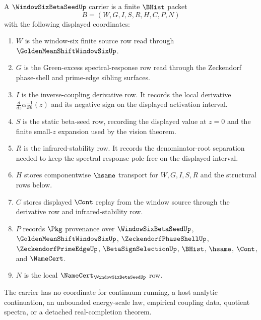 \begin{definition}
\label{def:window-six-beta-seed-carrier}
A $\WindowSixBetaSeedUp$ carrier is a finite $\BHist$ packet
$$
B=(W,G,I,S,R,H,C,P,N)
$$
with the following displayed coordinates:
\begin{enumerate}
\item $W$ is the window-six finite source row read through $\GoldenMeanShiftWindowSixUp$.
\item $G$ is the Green-excess spectral-response row read through the Zeckendorf phase-shell and prime-edge sibling surfaces.
\item $I$ is the inverse-coupling derivative row. It records the local derivative $\frac{d}{dz}\alpha_{Z6}^{-1}(z)$ and its negative sign on the displayed activation interval.
\item $S$ is the static beta-seed row, recording the displayed value at $z=0$ and the finite small-$z$ expansion used by the vision theorem.
\item $R$ is the infrared-stability row. It records the denominator-root separation needed to keep the spectral response pole-free on the displayed interval.
\item $H$ stores componentwise $\hsame$ transport for $W,G,I,S,R$ and the structural rows below.
\item $C$ stores displayed $\Cont$ replay from the window source through the derivative row and infrared-stability row.
\item $P$ records $\Pkg$ provenance over $\WindowSixBetaSeedUp$, $\GoldenMeanShiftWindowSixUp$, $\ZeckendorfPhaseShellUp$, $\ZeckendorfPrimeEdgeUp$, $\BetaSignSelectionUp$, $\BHist$, $\hsame$, $\Cont$, and $\NameCert$.
\item $N$ is the local $\NameCert_{\WindowSixBetaSeedUp}$ row.
\end{enumerate}
The carrier has no coordinate for continuum running, a host analytic continuation, an unbounded energy-scale law, empirical coupling data, quotient spectra, or a detached real-completion theorem.
\end{definition}

